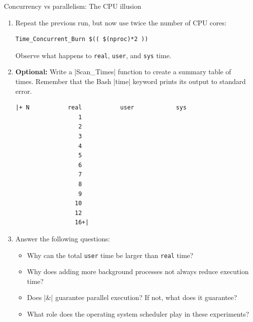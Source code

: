 \begin{exercise}[Inspirational]{Concurrency vs parallelism: The CPU illusion}
\begin{enumerate}
        \item Repeat the previous run, but now use twice the number of CPU cores:
              \begin{lstlisting}[style=MyBash]
                  Time_Concurrent_Burn $(( $(nproc)*2 ))
              \end{lstlisting}
              Observe what happens to \texttt{real}, \texttt{user}, and \texttt{sys} time.
        \item \textbf{Optional:}
              Write a \bash|Scan_Times| function to create a summary table of times.
              Remember that the Bash \bash|time| keyword prints its output to standard error.
              \begin{lstlisting}[style=MyBash]
                 |+ N           real           user            sys
                  1
                  2
                  3
                  4
                  5
                  6
                  7
                  8
                  9
                 10
                 12
                 16+|
              \end{lstlisting}
        \item Answer the following questions:
              \begin{itemize}[nosep]
                  \item Why can the total \texttt{user} time be larger than \texttt{real} time?
                  \item Why does adding more background processes not always reduce execution time?
                  \item Does \bash|&| guarantee parallel execution?
                        If not, what does it guarantee?
                  \item What role does the operating system scheduler play in these experiments?
              \end{itemize}
    \end{enumerate}
\end{exercise}